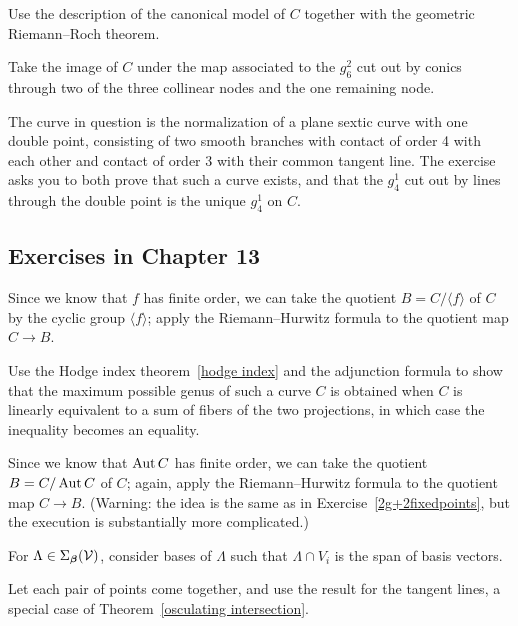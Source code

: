 Use the description of the canonical model of $C$ 
together with the geometric
Riemann--Roch theorem.
%
%

Take the image of $C$ under the map associated to the $g^2_6$
cut out by conics through two of the three collinear nodes and the one
remaining node.

The curve in question is the normalization of a plane sextic curve
with one double point, consisting of two smooth branches with contact of
order 4 with each other and contact of order 3 with their common tangent
line. The exercise asks you to both prove that such a curve exists,
and that the $g^1_4$ cut out by lines through the double point is the
unique $g^1_4$ on $C$.

\subsection*{Exercises in Chapter 13\nopunct}

Since we know that $f$ has finite order, we can take the quotient
$B = C/\langle f \rangle$ of $C$ by the cyclic group $\langle f \rangle$;
apply
the Riemann--Hurwitz formula
%
to the quotient map $C \to B$.

Use the Hodge index theorem~\ref{hodge index} and the adjunction
%
%
formula to show that the maximum possible genus of such
a curve $C$ is obtained when $C$ is linearly equivalent to a sum of
fibers of the two projections, in which case the inequality
becomes an equality.

 Since we know that $\operatorname{Aut} C$ has finite order, we can take
the quotient $B = C/\operatorname{Aut} C$ of $C$; again, apply
the Riemann--Hurwitz formula
%
%
to the quotient map $C \to B$. (Warning: the idea is the same as in
Exercise~\ref{2g+2fixedpoints}, but the execution is substantially
more complicated.)

For $\Lambda \in \Sigma_{{\boldsymbol{\beta}}}({\mathcal V})$, consider bases of
$\Lambda$ such that $\Lambda \cap V_i$ is the span of basis vectors.

Let each pair of points come together, and use the result
for the tangent lines, a special case of Theorem~\ref{osculating
intersection}.

